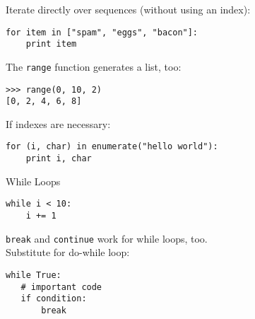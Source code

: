 \begin{frame}[fragile]
Iterate directly over sequences (without using an index):
\begin{lstlisting}[style=Python]
for item in ["spam", "eggs", "bacon"]:
    print item
\end{lstlisting}

The \texttt{range} function generates a list, too:
\begin{lstlisting}[style=Shell]
>>> range(0, 10, 2)
[0, 2, 4, 6, 8]
\end{lstlisting}
If indexes are necessary:
\begin{lstlisting}[style=Python]
for (i, char) in enumerate("hello world"):
    print i, char
\end{lstlisting}
\end{frame}

\begin{frame}[fragile]{While Loops}
\begin{lstlisting}[style=Python]
while i < 10:
    i += 1
\end{lstlisting}
\lstinline{break} and \lstinline{continue} work for while loops, too.\\[3mm]
Substitute for do-while loop:
\begin{lstlisting}[style=Python]
while True:
   # important code
   if condition:
       break
\end{lstlisting} 
\end{frame}

